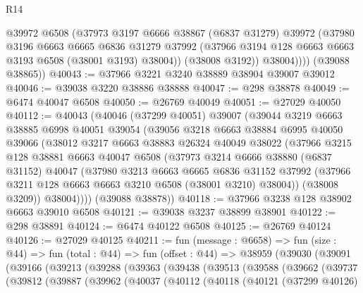 \begin{lexlean}{R14}
\begin{coremodule}
              @39972
              @6508
              (@37973
                @3197
                @6666
                @38867
                (@6837 @31279)
                @39972
                (@37980
                  @3196
                  @6663
                  @6665
                  @6836
                  @31279
                  @37992
                  (@37966 @3194 @128 @6663 @6663 @3193 @6508 (@38001 @3193) @38004))
                (@38008 @3192))
              @38004))))
      (@39088 @38865))
@40043 := @37966 @3221 @3240 @38889 @38904 @39007 @39012
@40046 := @39038 @3220 @38886 @38888
@40047 := @298 @38878
@40049 := @6474 @40047 @6508
@40050 := @26769 @40049
@40051 := @27029 @40050
@40112 := @40043
    (@40046
      (@37299 @40051)
      @39007
      (@39044
        @3219
        @6663
        @38885
        @6998
        @40051
        @39054
        (@39056
          @3218
          @6663
          @38884
          @6995
          @40050
          @39066
          (@38012
            @3217
            @6663
            @38883
            @26324
            @40049
            @38022
            (@37966
              @3215
              @128
              @38881
              @6663
              @40047
              @6508
              (@37973
                @3214
                @6666
                @38880
                (@6837 @31152)
                @40047
                (@37980
                  @3213
                  @6663
                  @6665
                  @6836
                  @31152
                  @37992
                  (@37966 @3211 @128 @6663 @6663 @3210 @6508 (@38001 @3210) @38004))
                (@38008 @3209))
              @38004))))
      (@39088 @38878))
@40118 := @37966 @3238 @128 @38902 @6663 @39010 @6508
@40121 := @39038 @3237 @38899 @38901
@40122 := @298 @38891
@40124 := @6474 @40122 @6508
@40125 := @26769 @40124
@40126 := @27029 @40125
@40211 := fun (message : @6658) =>
  fun (size : @44) =>
  fun (total : @44) =>
  fun (offset : @44) =>
  @38959
    (@39030
      (@39091
        (@39166
          (@39213
            (@39288
              (@39363
                (@39438
                  (@39513
                    (@39588
                      (@39662
                        (@39737
                          (@39812
                            (@39887
                              (@39962
                                (@40037
                                  (@40112
                                    (@40118
                                      (@40121
                                        (@37299 @40126)

\end{coremodule}
\end{lexlean}
